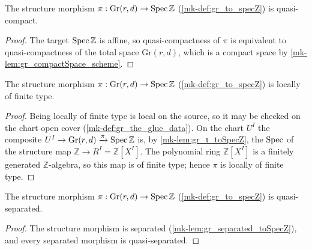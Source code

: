 \begin{lemma}\label{mk-lem:gr_quasiCompact_toSpecZ}
  \leanok

  The structure morphism \(\pi : \mathrm{Gr}(r,d) \to \operatorname{Spec} \mathbb{Z}\)
  (\ref{mk-def:gr_to_specZ}) is quasi-compact.
\end{lemma}
\begin{proof}
  \leanok
  The target \(\operatorname{Spec} \mathbb{Z}\) is affine, so quasi-compactness of \(\pi\) is
  equivalent to quasi-compactness of the total space \(\mathrm{Gr}(r,d)\), which is
  a compact space by \ref{mk-lem:gr_compactSpace_scheme}.
\end{proof}

\begin{lemma}\label{mk-lem:gr_locallyOfFiniteType_toSpecZ}
  \leanok

  The structure morphism \(\pi : \mathrm{Gr}(r,d) \to \operatorname{Spec} \mathbb{Z}\)
  (\ref{mk-def:gr_to_specZ}) is locally of finite type.
\end{lemma}
\begin{proof}
  \leanok
  Being locally of finite type is local on the source, so it may be checked on the
  chart open cover (\ref{mk-def:gr_the_glue_data}). On the chart \(U^I\) the composite
  \(U^I \to \mathrm{Gr}(r,d) \xrightarrow{\pi} \operatorname{Spec} \mathbb{Z}\) is, by
  \ref{mk-lem:gr_ι_toSpecZ}, the \(\operatorname{Spec}\) of the structure map \(\mathbb{Z} \to R^I
  = \mathbb{Z}[X^I]\). The polynomial ring \(\mathbb{Z}[X^I]\) is a finitely
  generated \(\mathbb{Z}\)-algebra, so this map is of finite type; hence \(\pi\) is
  locally of finite type.
\end{proof}

\begin{lemma}\label{mk-lem:gr_quasiSeparated_toSpecZ}
  \leanok

  The structure morphism \(\pi : \mathrm{Gr}(r,d) \to \operatorname{Spec} \mathbb{Z}\)
  (\ref{mk-def:gr_to_specZ}) is quasi-separated.
\end{lemma}
\begin{proof}
  \leanok
  The structure morphism is separated (\ref{mk-lem:gr_separated_toSpecZ}), and every
  separated morphism is quasi-separated.
\end{proof}

